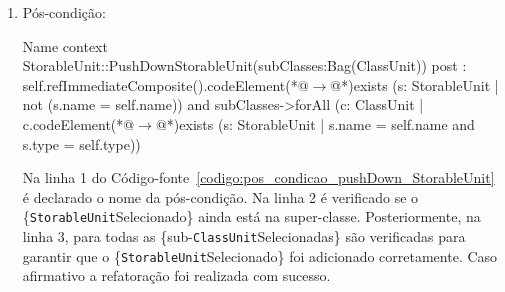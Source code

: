 \begin{enumerate}
\begin{enumerate}
			\item Pós-condição:
			 \begin{codigo}[caption={[OCL representando a pós-condição da refatoração \textit{Push Down StorableUnit}.] Pós-condição da refatoração \textit{Push Down StorableUnit}.},escapeinside={(*@}{@*)}, basicstyle=\footnotesize, label={codigo:pos_condicao_pushDown_StorableUnit}, language=OCL]{Name}
context StorableUnit::PushDownStorableUnit(subClasses:Bag(ClassUnit))
post : self.refImmediateComposite().codeElement(*@$\rightarrow$@*)exists (s: StorableUnit | not (s.name = self.name)) 
and subClasses->forAll (c: ClassUnit | c.codeElement(*@$\rightarrow$@*)exists (s: StorableUnit | s.name = self.name and s.type = self.type))
\end{codigo}
Na linha 1 do Código-fonte~\ref{codigo:pos_condicao_pushDown_StorableUnit} é declarado o nome da pós-condição. Na linha 2 é verificado se o \{\texttt{StorableUnit}Selecionado\} ainda está na super-classe. Posteriormente, na linha 3, para todas as \{sub-\texttt{ClassUnit}Selecionadas\} são verificadas para garantir que o \{\texttt{StorableUnit}Selecionado\} foi adicionado corretamente. Caso afirmativo a refatoração foi realizada com sucesso.
		\end{enumerate}
	\end{enumerate}		
	
